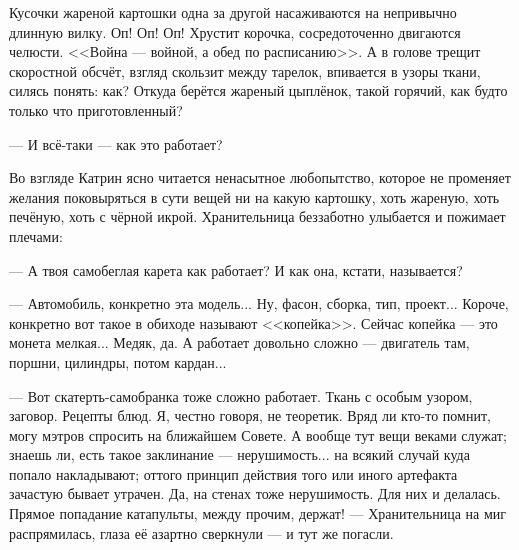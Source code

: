 Кусочки жареной картошки одна за другой насаживаются на непривычно длинную вилку. Оп! Оп! Оп!
Хрустит корочка, сосредоточенно двигаются челюсти. <<Война --- войной, а обед по расписанию>>.
А в голове трещит скоростной обсчёт, взгляд скользит между тарелок, впивается в узоры ткани, силясь понять: как?
Откуда берётся жареный цыплёнок, такой горячий, как будто только что приготовленный?

--- И всё-таки --- как это работает?

Во взгляде Катрин ясно читается ненасытное любопытство, которое не променяет желания поковыряться в сути вещей
ни на какую картошку, хоть жареную, хоть печёную, хоть с чёрной икрой. Хранительница беззаботно улыбается и пожимает плечами:

--- А твоя самобеглая карета как работает? И как она, кстати, называется?

--- Автомобиль, конкретно эта модель... Ну, фасон, сборка, тип, проект...
Короче, конкретно вот такое в обиходе называют <<копейка>>. Сейчас копейка --- это монета мелкая... Медяк, да.
А работает довольно сложно --- двигатель там, поршни, цилиндры, потом кардан...

--- Вот скатерть-самобранка тоже сложно работает. Ткань с особым узором, заговор. Рецепты блюд.
Я, честно говоря, не теоретик. Вряд ли кто-то помнит, могу мэтров спросить на ближайшем Совете.
А вообще тут вещи веками служат; знаешь ли, есть такое заклинание --- нерушимость... на всякий случай куда попало накладывают;
оттого принцип действия того или иного артефакта зачастую бывает утрачен. Да, на стенах тоже нерушимость. Для них и делалась.
Прямое попадание катапульты, между прочим, держат! --- Хранительница на миг распрямилась,
глаза её азартно сверкнули --- и тут же погасли.

